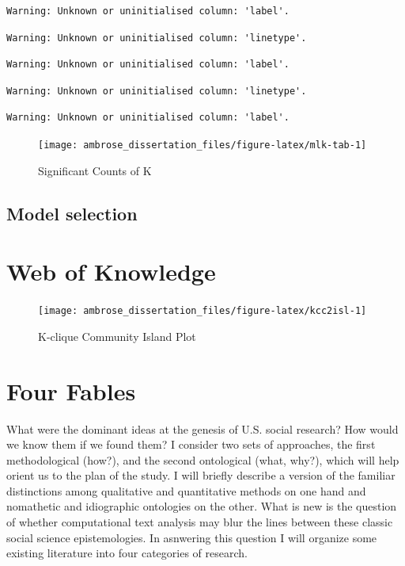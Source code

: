 \documentclass[]{book}
\begin{document}
\begin{verbatim}
Warning: Unknown or uninitialised column: 'label'.
\end{verbatim}

\begin{verbatim}
Warning: Unknown or uninitialised column: 'linetype'.
\end{verbatim}

\begin{verbatim}
Warning: Unknown or uninitialised column: 'label'.
\end{verbatim}

\begin{verbatim}
Warning: Unknown or uninitialised column: 'linetype'.
\end{verbatim}

\begin{verbatim}
Warning: Unknown or uninitialised column: 'label'.
\end{verbatim}

\begin{figure}

{\centering \texttt{[image: ambrose\_dissertation\_files/figure-latex/mlk-tab-1]} 

}

\caption{Significant Counts of K}\label{fig:mlk-tab}
\end{figure}

\section{Model selection}\label{model-selection}

\chapter{Web of Knowledge}\label{web-of-knowledge}

\begin{figure}

{\centering \texttt{[image: ambrose\_dissertation\_files/figure-latex/kcc2isl-1]} 

}

\caption{K-clique Community Island Plot}\label{fig:kcc2isl}
\end{figure}

\chapter{Four Fables}\label{four-fables}

What were the dominant ideas at the genesis of U.S. social research? How
would we know them if we found them? I consider two sets of approaches,
the first methodological (how?), and the second ontological (what,
why?), which will help orient us to the plan of the study. I will
briefly describe a version of the familiar distinctions among
qualitative and quantitative methods on one hand and nomathetic and
idiographic ontologies on the other. What is new is the question of
whether computational text analysis may blur the lines between these
classic social science epistemologies. In asnwering this question I will
organize some existing literature into four categories of research.
\end{document}
